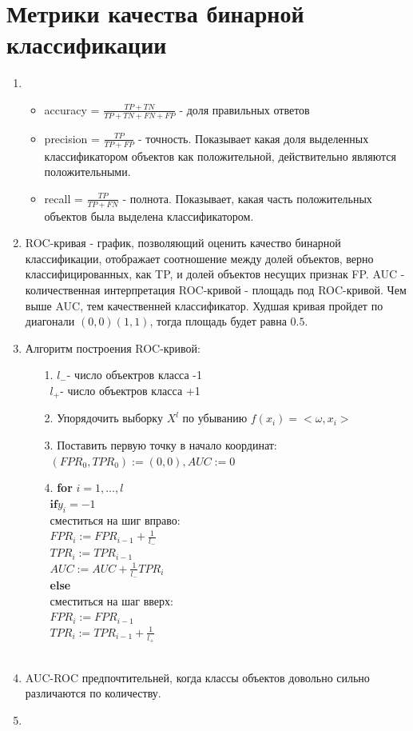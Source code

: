 \documentclass[12pt]{article}
\begin{document}
\section{Метрики качества бинарной классификации}
\begin{enumerate}
\item
\begin{itemize}
\item accuracy = $\frac{TP + TN}{TP + TN + FN + FP}$ - доля правильных ответов
\item precision = $\frac{TP}{TP + FP}$ - точность. Показывает какая доля выделенных классификатором объектов как положительной, действительно являются положительными.
\item recall = $\frac{TP}{TP + FN}$ - полнота. Показывает, какая часть положительных объектов была выделена классификатором.
\end{itemize}
\item ROC-кривая - график, позволяющий оценить качество бинарной классификации,  отображает соотношение между долей объектов, верно классифицированных, как TP, и долей объектов несущих признак FP. AUC - количественная интерпретация ROC-кривой - площадь под ROC-кривой. Чем выше AUC, тем качественней классификатор. Худшая кривая пройдет по диагонали $(0,0)(1,1)$, тогда площадь будет равна $0.5$.
\item Алгоритм построения ROC-кривой:
\begin{enumerate}
\item[1.] $l_{-}$- число объектров класса -1\\\
		  $l_{+}$- число объектров класса +1
\item[2.] Упорядочить выборку $X^l$ по убыванию $f(x_i)=<\omega, x_i>$
\item[3.] Поставить первую точку в начало координат:\\\
		  $(FPR_0,TPR_0):= (0,0), AUC:= 0$
\item[4.] \textbf{for} $i=1,...,l$\\\
			$\textbf{if} y_i = -1$\\\
			сместиться на шиг вправо:\\\
			$FPR_i:=FPR_{i-1}+\frac{1}{l_{-}}$\\\
			$TPR_i:=TPR_{i-1}$\\\
			$AUC:=AUC+\frac{1}{l_{-}}TPR_i$\\\
		 \textbf{else} \\\
		 сместиться на шаг вверх:\\\
		 $FPR_i:=FPR_{i-1}$\\\
		 $TPR_i:=TPR_{i-1}+\frac{1}{l_{+}}$\\\
		
\end{enumerate}
\item AUC-ROC предпочтительней, когда классы объектов довольно сильно различаются по количеству.
\item

\end{enumerate}
\end{document}
